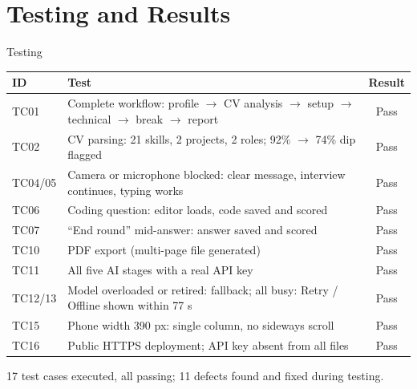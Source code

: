 \documentclass[aspectratio=169,11pt,xcolor=table]{beamer}
\begin{document}
\section{Testing and Results}
\begin{frame}{Testing}
  \footnotesize
  \begin{tabularx}{\textwidth}{@{}lYc@{}}
    \toprule
    \textbf{ID} & \textbf{Test} & \textbf{Result} \\
    \midrule
    TC01 & Complete workflow: profile $\to$ CV analysis $\to$ setup $\to$ technical $\to$ break $\to$ report & Pass \\
    TC02 & CV parsing: 21 skills, 2 projects, 2 roles; 92\% $\to$ 74\% dip flagged & Pass \\
    TC04/05 & Camera or microphone blocked: clear message, interview continues, typing works & Pass \\
    TC06 & Coding question: editor loads, code saved and scored & Pass \\
    TC07 & ``End round'' mid-answer: answer saved and scored & Pass \\
    TC10 & PDF export (multi-page file generated) & Pass \\
    TC11 & All five AI stages with a real API key & Pass \\
    TC12/13 & Model overloaded or retired: fallback; all busy: Retry / Offline shown within 77 s & Pass \\
    TC15 & Phone width 390 px: single column, no sideways scroll & Pass \\
    TC16 & Public HTTPS deployment; API key absent from all files & Pass \\
    \bottomrule
  \end{tabularx}
  \vspace{0.2cm}

  \small 17 test cases executed, all passing; 11 defects found and fixed during testing.
\end{frame}
\end{document}
